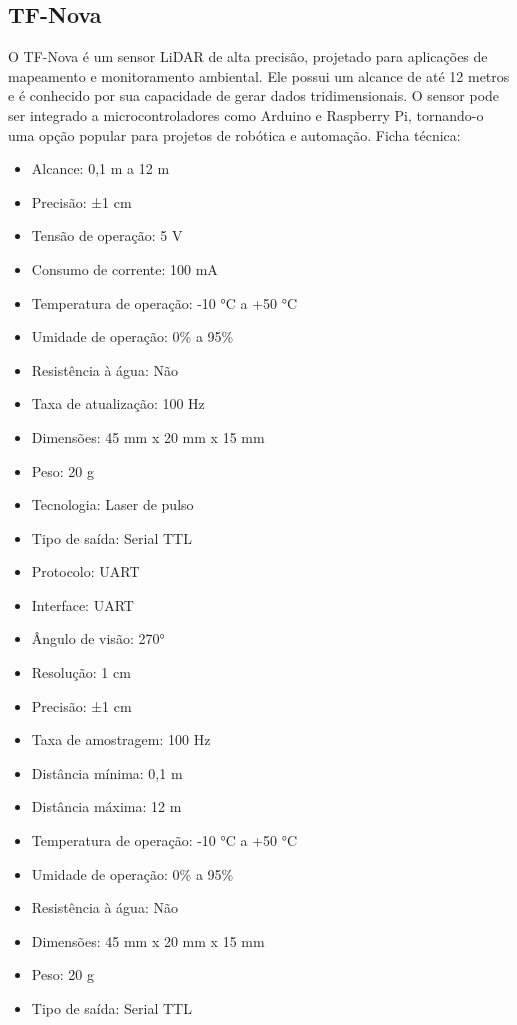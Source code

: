 \subsection{TF-Nova}
O TF-Nova é um sensor LiDAR de alta precisão, projetado para aplicações de mapeamento e monitoramento ambiental. Ele possui um alcance de até 12 metros e é conhecido por sua capacidade de gerar dados tridimensionais. O sensor pode ser integrado a microcontroladores como Arduino e Raspberry Pi, tornando-o uma opção popular para projetos de robótica e automação.
Ficha técnica:
\begin{itemize}
	\item Alcance: 0,1 m a 12 m
	\item Precisão: ±1 cm
	\item Tensão de operação: 5 V
	\item Consumo de corrente: 100 mA
	\item Temperatura de operação: -10 °C a +50 °C
	\item Umidade de operação: 0\% a 95\%
	\item Resistência à água: Não
	\item Taxa de atualização: 100 Hz
	\item Dimensões: 45 mm x 20 mm x 15 mm
	\item Peso: 20 g
	\item Tecnologia: Laser de pulso
	\item Tipo de saída: Serial TTL
	\item Protocolo: UART
	\item Interface: UART
	\item Ângulo de visão: 270°
	\item Resolução: 1 cm
	\item Precisão: ±1 cm
	\item Taxa de amostragem: 100 Hz
	\item Distância mínima: 0,1 m
	\item Distância máxima: 12 m
	\item Temperatura de operação: -10 °C a +50 °C
	\item Umidade de operação: 0\% a 95\%
	\item Resistência à água: Não	
	\item Dimensões: 45 mm x 20 mm x 15 mm
	\item Peso: 20 g
	\item Tipo de saída: Serial TTL
\end{itemize}

